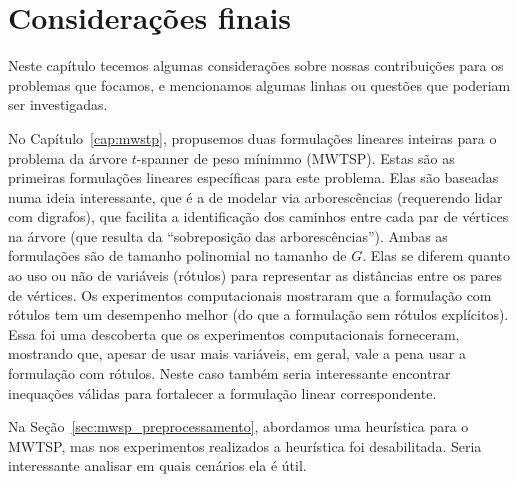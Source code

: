 
\chapter{Considerações finais}
\label{cap:conclusoes}
Neste capítulo tecemos algumas considerações sobre nossas
contribuições para os problemas que focamos, e mencionamos algumas
linhas ou questões que poderiam ser investigadas.

No Capítulo~\ref{cap:mwstp}, propusemos duas formulações lineares
inteiras para o problema da árvore $t$-spanner de peso mínimmo
(MWTSP). Estas são as primeiras formulações lineares específicas para
este problema.  Elas são baseadas numa ideia interessante, que é a de
modelar via arborescências (requerendo lidar com digrafos), que
facilita a identificação dos caminhos entre cada par de vértices na
árvore (que resulta da ``sobreposição das arborescências'').  Ambas as
formulações são de tamanho polinomial no tamanho de $G$. Elas se diferem quanto ao uso
ou não de variáveis (rótulos) para representar as distâncias entre os
pares de vértices. Os experimentos computacionais mostraram que a
formulação com rótulos tem um desempenho melhor (do que a formulação
sem rótulos explícitos). Essa foi uma descoberta que os experimentos
computacionais forneceram, mostrando que, apesar de usar mais
variáveis, em geral, vale a pena usar a formulação com rótulos.  Neste
caso também seria interessante encontrar inequações válidas para
fortalecer a formulação linear correspondente.


Na Seção~\ref{sec:mwsp_preprocessamento}, abordamos uma
heurística para o MWTSP, mas nos experimentos realizados a
heurística foi desabilitada. Seria interessante analisar em
quais cenários ela é útil.

